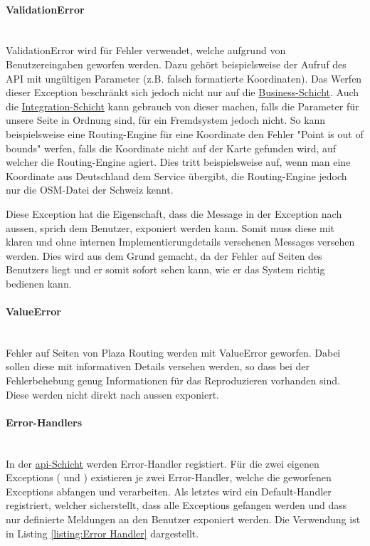 \paragraph{ValidationError}\label{ehp:PR:ValidationErrorr}~\\
ValidationError wird für Fehler verwendet, welche aufgrund von Benutzereingaben geworfen werden. Dazu gehört beispielsweise der Aufruf des \ac{API} mit ungültigen Parameter (z.B. falsch formatierte Koordinaten). Das Werfen dieser Exception beschränkt sich jedoch nicht nur auf die \hyperref[architektur:business-layer]{Business-Schicht}. Auch die \hyperref[architektur:integration-layer]{Integration-Schicht} kann gebrauch von dieser machen, falls die Parameter für unsere Seite in Ordnung sind, für ein Fremdsystem jedoch nicht. So kann beispielsweise eine Routing-Engine für eine Koordinate den Fehler "Point is out of bounds" werfen, falls die Koordinate nicht auf der Karte gefunden wird, auf welcher die Routing-Engine agiert. Dies tritt beispielsweise auf, wenn man eine Koordinate aus Deutschland dem Service übergibt, die Routing-Engine jedoch nur die \ac{OSM}-Datei der Schweiz kennt.

Diese Exception hat die Eigenschaft, dass die Message in der Exception nach aussen, sprich dem Benutzer, exponiert werden kann. Somit muss diese mit klaren und ohne internen Implementierungdetails versehenen Messages versehen werden. Dies wird aus dem Grund gemacht, da der Fehler auf Seiten des Benutzers liegt und er somit sofort sehen kann, wie er das System richtig bedienen kann.

\paragraph{ValueError}\label{ehp:PR:ValueError}~\\
Fehler auf Seiten von Plaza Routing werden mit ValueError geworfen. Dabei sollen diese mit informativen Details versehen werden, so dass bei der Fehlerbehebung genug Informationen für das Reproduzieren vorhanden sind. Diese werden nicht direkt nach aussen exponiert.

\paragraph{Error-Handlers}\label{ehp:Error Handlers}~\\
In der \hyperref[architektur:api-layer]{api-Schicht} werden Error-Handler registiert. Für die zwei eigenen Exceptions ( und ) existieren je zwei Error-Handler, welche die geworfenen Exceptions abfangen und verarbeiten. Als letztes wird ein Default-Handler registriert, welcher sicherstellt, dass alle Exceptions gefangen werden und dass nur definierte Meldungen an den Benutzer exponiert werden. Die Verwendung ist in Listing \ref{listing:Error Handler} dargestellt.

